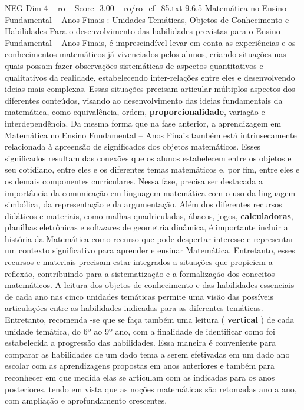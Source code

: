 \begin{textsample}{NEG Dim 4 – ro – Score -3.00 – ro/ro\_ef\_85.txt}  \label{ex:f4_neg_073}
9.6.5 Matemática no Ensino Fundamental – Anos Finais : Unidades Temáticas, Objetos de Conhecimento e Habilidades Para o desenvolvimento das habilidades previstas para o Ensino Fundamental – Anos Finais, é imprescindível levar em conta as experiências e os conhecimentos matemáticos já vivenciados pelos alunos, criando situações nas quais possam fazer observações sistemáticas de aspectos quantitativos e qualitativos da realidade, estabelecendo inter-relações entre eles e desenvolvendo ideias mais complexas.
Essas situações precisam articular múltiplos aspectos dos diferentes conteúdos, visando ao desenvolvimento das ideias fundamentais da matemática, como equivalência, ordem, \textbf{proporcionalidade}, variação e interdependência.
Da mesma forma que na fase anterior, a aprendizagem em Matemática no Ensino Fundamental – Anos Finais também está intrinsecamente relacionada à apreensão de significados dos objetos matemáticos.
Esses significados resultam das conexões que os alunos estabelecem entre os objetos e seu cotidiano, entre eles e os diferentes temas matemáticos e, por fim, entre eles e os demais componentes curriculares.
Nessa fase, precisa ser destacada a importância da comunicação em linguagem matemática com o uso da linguagem simbólica, da representação e da argumentação.
Além dos diferentes recursos didáticos e materiais, como malhas quadriculadas, ábacos, jogos, \textbf{calculadoras}, planilhas eletrônicas e softwares de geometria dinâmica, é importante incluir a história da Matemática como recurso que pode despertar interesse e representar um contexto significativo para aprender e ensinar Matemática.
Entretanto, esses recursos e materiais precisam estar integrados a situações que propiciem a reflexão, contribuindo para a sistematização e a formalização dos conceitos matemáticos.
A leitura dos objetos de conhecimento e das habilidades essenciais de cada ano nas cinco unidades temáticas permite uma visão das possíveis articulações entre as habilidades indicadas para as diferentes temáticas.
Entretanto, recomenda -se que se faça também uma leitura ( \textbf{vertical} ) de cada unidade temática, do 6º ao 9º ano, com a finalidade de identificar como foi estabelecida a progressão das habilidades.
Essa maneira é conveniente para comparar as habilidades de um dado tema a serem efetivadas em um dado ano escolar com as aprendizagens propostas em anos anteriores e também para reconhecer em que medida elas se articulam com as indicadas para os anos posteriores, tendo em vista que as noções matemáticas são retomadas ano a ano, com ampliação e aprofundamento crescentes.

\end{textsample}
